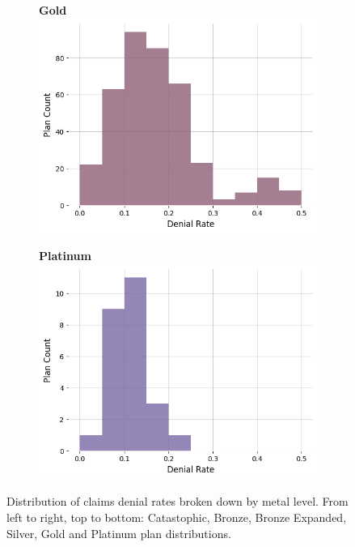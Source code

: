 \documentclass[12pt, a4paper,twoside]{report}
\theoremstyle{plain} %
\theoremstyle{definition} %
\theoremstyle{remark} %
\numberwithin{equation}{chapter}
\begin{document}
\begin{figure}
				\begin{subfigure}[t]{0.49\textwidth}
					\centering
					\textbf{Gold}
					\includegraphics[width=\textwidth]{images/cms_puf/Gold_dist.png}
				\end{subfigure}
				\hfill
				\begin{subfigure}[t]{0.49\textwidth}
					\centering
					\textbf{Platinum}
					\includegraphics[width=\textwidth]{images/cms_puf/Platinum_dist.png}
				\end{subfigure}

				
				\caption{Distribution of claims denial rates broken down by metal level. From left to right, top to bottom: Catastophic, Bronze, Bronze Expanded, Silver, Gold and Platinum plan distributions.}
				\label{federaldenialratesbymetallevel}
			\end{figure}
		
\end{document}
